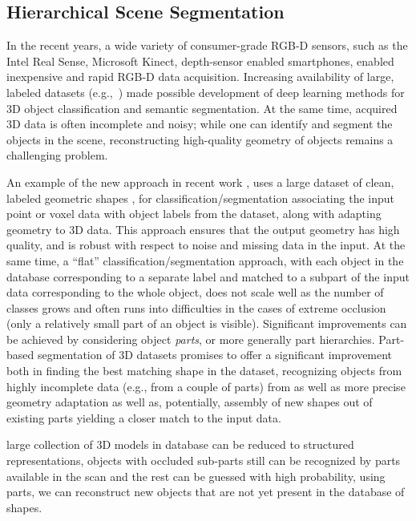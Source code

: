 \subsection{Hierarchical Scene Segmentation}

In the recent years, a wide variety of consumer-grade RGB-D sensors, such as the Intel Real Sense, Microsoft Kinect, depth-sensor enabled smartphones, enabled inexpensive and rapid RGB-D data acquisition. Increasing availability of large, labeled datasets (e.g.,~\cite{chang2017matterport3d,dai2017scannet})  made possible development of deep learning methods for 3D object classification and semantic segmentation. At the same time, acquired 3D data is often incomplete and noisy; while one can identify and segment the objects in the scene, reconstructing high-quality geometry of objects remains a challenging problem.  

An example of the new approach in recent work 
\cite{avetisyan2019scan2cad}, uses a large dataset of clean, labeled geometric shapes
\cite{chang2015shapenet}, for classification/segmentation associating the input point or voxel data with object labels from the dataset, along with adapting geometry to 3D data.  This approach ensures that the output geometry has high quality, and is robust with respect to noise and missing data in the input.  
At the same time, a ``flat'' classification/segmentation approach, with each object in the database corresponding to a separate label and matched to a subpart of the input data corresponding to the whole object, does not scale well as the number of classes grows and often runs into difficulties in the cases of extreme occlusion (only a relatively small part of an object is visible). 
Significant improvements can be achieved by considering object \emph{parts}, or more generally part hierarchies. 
Part-based segmentation of 3D datasets promises to offer a significant improvement both in finding the best matching shape in the dataset, recognizing objects from  highly incomplete data (e.g., from a couple of parts) from  as well as more precise geometry adaptation as well as, potentially, assembly of new shapes out of existing parts yielding a closer match to the input data. 

large collection of 3D models in database can be reduced to structured representations, 
objects with occluded sub-parts still can be recognized by parts available in the scan and the rest can be guessed with high probability, using parts, we can reconstruct new objects that are not yet present in the database of shapes.

